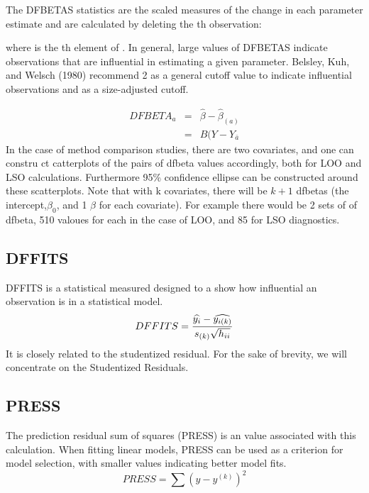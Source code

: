 \documentclass[Main.tex]{subfiles}
\begin{document}
		
		The DFBETAS statistics are the scaled measures of the change in each parameter estimate and are calculated by deleting the th observation:
		
		where  is the th element of .
		In general, large values of DFBETAS indicate observations that are influential in estimating a given parameter. Belsley, Kuh, and Welsch (1980) recommend 2 as a general cutoff value to indicate influential observations and  as a size-adjusted cutoff.
		
	\begin{eqnarray}
	DFBETA_{a} &=& \hat{\beta} - \hat{\beta}_{(a)} \\
	&=& B(Y-Y_{\bar{a}}
	\end{eqnarray}
	In the case of method comparison studies, there are two covariates, and one can constru
	ct catterplots of the pairs of dfbeta values accordingly, both for LOO and LSO calculations. Furthermore 95\% confidence ellipse can be constructed around these scatterplots.
	Note that with k covariates, there will be $k+1$ dfbetas (the intercept,$\beta_0$, and 1 $\beta$ for each covariate). For example there would be 2 sets of of dfbeta, 510 valoues for each in the case of LOO, and 85 for LSO diagnostics.
	
	
	
	\subsection{DFFITS} %
	DFFITS is a statistical measured designed to a show how influential an observation is in a statistical model. 
	\begin{displaymath} DFFITS = {\widehat{y_i} -
		\widehat{y_{i(k)}} \over s_{(k)} \sqrt{h_{ii}}} \end{displaymath}
	It is closely related to the studentized residual. For the sake of brevity, we will concentrate on the Studentized Residuals.
	\subsection{PRESS} %
	The prediction residual sum of squares (PRESS) is an value associated with this calculation. When fitting linear models, PRESS can be used as a criterion for model selection, with smaller values indicating better model fits.
	\begin{equation}
	PRESS = \sum(y-y^{(k)})^2
	\end{equation}
	
\end{document}
